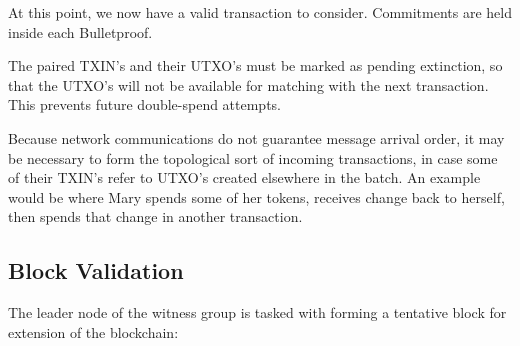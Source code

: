 \documentclass[a4paper, 10pt, conference]{ieeeconf}
\begin{document}
At this point, we now have a valid transaction to consider. Commitments are held inside each Bulletproof.

The paired TXIN's and their UTXO's must be marked as pending extinction, so that the UTXO's will not be available for matching with the next transaction. This prevents future double-spend attempts.

Because network communications do not guarantee message arrival order, it may be necessary to form the topological sort of incoming transactions, in case some of their TXIN's refer to UTXO's created elsewhere in the batch. An example would be where Mary spends some of her tokens, receives change back to herself, then spends that change in another transaction.

\subsection{Block Validation}
The leader node of the witness group is tasked with forming a tentative block for extension of the blockchain:
\end{document}
